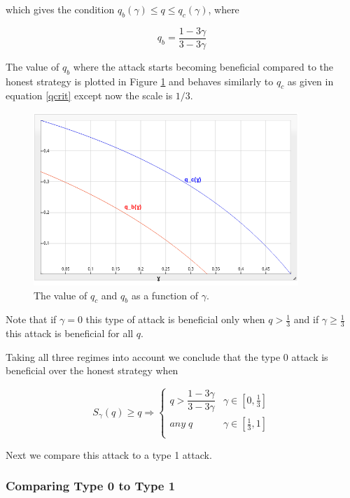 \documentclass[letterpaper,12pt]{report}
\theoremstyle{plain}
\theoremstyle{definition}
\begin{document}
which gives the condition $q_b(\gamma)\leq q \leq q_c(\gamma)$, where 

\begin{equation}\label{eqn:qb}
q_b= \dfrac{1-3\gamma}{3-3\gamma}
\end{equation}

The value of $q_b$ where the attack starts becoming beneficial compared to the honest strategy is plotted in Figure \ref{fig:qbenefit} and behaves similarly to $q_c$ as given in equation \ref{qcrit} except now the scale is $1/3$.

\begin{figure}[qcrit]
\centering
\includegraphics[width=100mm]{qcqb.png}
\caption{The value of $q_c$ and $q_b$ as a function of $\gamma$.}
\label{fig:qbenefit}
\end{figure}

Note that if $\gamma=0$ this type of attack is beneficial only when $q>\frac{1}{3}$ and if $\gamma\geq\frac{1}{3}$ this attack is beneficial for all $q$.

Taking all three regimes into account we conclude that the type 0 attack is beneficial over the honest strategy when

\begin{equation}\label{0overhonest}
S_{\gamma}(q)\geq q \Longrightarrow
\begin{cases}
q>\dfrac{1-3\gamma}{3-3\gamma} & \gamma\in [0,\frac{1}{3}] \\ 
\mathit{any\;} q & \gamma\in [\frac{1}{3},1] \\ 
\end{cases}
\end{equation}

Next we compare this attack to a type 1 attack.

\subsubsection{Comparing Type 0 to Type 1}
\end{document}
